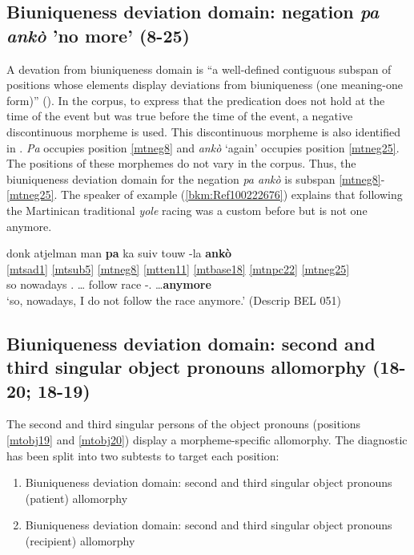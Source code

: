 \documentclass[output=paper]{langscibook}
\begin{document}
\subsection{Biuniqueness deviation domain: negation \textit{pa} \textit{ankò} 'no more' (8-25)}

A devation from biuniqueness domain is ``a well-defined contiguous subspan of positions whose elements display deviations from biuniqueness (one meaning-one form)'' (\citealt[16]{tallman2021constituency}). In the corpus, to express that the predication does not hold at the time of the event but was true before the time of the event, a negative discontinuous morpheme is used. This discontinuous morpheme is also identified in \citet[41]{PinalieBernabe1999}. \textit{Pa} \Neg{} occupies position \ref{mtneg8} and \textit{ankò} `again' occupies position \ref{mtneg25}. The positions of these morphemes do not vary in the corpus. Thus, the biuniqueness deviation domain for the negation \textit{pa ankò} is subspan \ref{mtneg8}-\ref{mtneg25}. The speaker of example (\ref{bkm:Ref100222676}) explains that following the Martinican traditional \textit{yole} racing was a custom before but is not one anymore.

\ea\label{bkm:Ref100222676}
\glll donk atjelman man \textbf{pa} ka suiv touw -la \textbf{ankò}\\
 \ref{mtsad1} {} \ref{mtsub5} \ref{mtneg8} \ref{mtten11} \ref{mtbase18} \ref{mtnpc22} {} \ref{mtneg25} \\
so nowadays \First\Sg.\Sarg{} \textbf{\Neg{}}… \Impf{} follow race -\Def.\Art{} …\textbf{anymore}\\
\glt `so, nowadays, I do not follow the race anymore.' (Descrip BEL 051)
\z

\subsection{Biuniqueness deviation domain: second and third singular object pronouns allomorphy (18-20; 18-19)}

The second and third singular persons of the object pronouns (positions \ref{mtobj19} and \ref{mtobj20}) display a morpheme-specific allomorphy. The diagnostic has been split into two subtests to target each position:

\begin{enumerate}
\item Biuniqueness deviation domain: second and third singular object pronouns (patient) allomorphy 
\item Biuniqueness deviation domain: second and third singular object pronouns (recipient) allomorphy
\end{enumerate}
\end{document}
